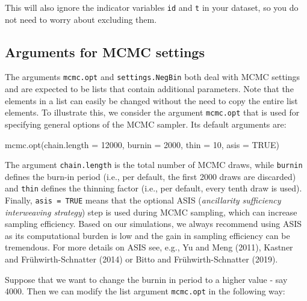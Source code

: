 \documentclass[a4paper, preprint, 3p,
authoryear]{elsarticle} %
\newenvironment{Shaded}{\begin{snugshade}}{\end{snugshade}}
\newcommand{\NormalTok}[1]{#1}
\begin{document}
This will also ignore the indicator variables \texttt{id} and \texttt{t}
in your dataset, so you do not need to worry about excluding them.

\subsection{Arguments for MCMC
settings}\label{arguments-for-mcmc-settings}

The arguments \texttt{mcmc.opt} and \texttt{settings.NegBin} both deal
with MCMC settings and are expected to be lists that contain additional
parameters. Note that the elements in a list can easily be changed
without the need to copy the entire list elements. To illustrate this,
we consider the argument \texttt{mcmc.opt} that is used for specifying
general options of the MCMC sampler. Its default arguments are:

\begin{Shaded}
\begin{Highlighting}[]
\NormalTok{mcmc.opt(chain.length = 12000, burnin = 2000, thin = 10, asis = TRUE)}
\end{Highlighting}
\end{Shaded}

The argument \texttt{chain.length} is the total number of MCMC draws,
while \texttt{burnin} defines the burn-in period (i.e., per default, the
first 2000 draws are discarded) and \texttt{thin} defines the thinning
factor (i.e., per default, every tenth draw is used). Finally,
\texttt{asis = TRUE} means that the optional ASIS
(\textit{ancillarity sufficiency interweaving strategy}) step is used
during MCMC sampling, which can increase sampling efficiency. Based on
our simulations, we always recommend using ASIS as its computational
burden is low and the gain in sampling efficiency can be tremendous. For
more details on ASIS see, e.g., Yu and Meng (2011), Kastner and
Frühwirth-Schnatter (2014) or Bitto and Frühwirth-Schnatter (2019).

Suppose that we want to change the burnin in period to a higher value -
say 4000. Then we can modify the list argument \texttt{mcmc.opt} in the
following way:

\begin{Shaded}
\end{Shaded}
\end{document}
